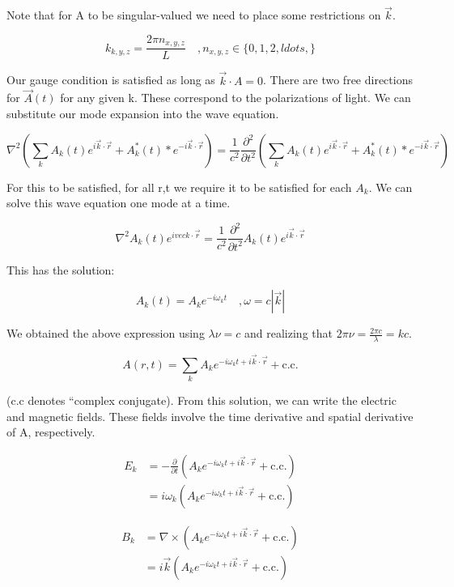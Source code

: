 \documentclass{article}
\begin{document}
Note that for A to be singular-valued we need to place some restrictions on
$\vec{k}$.

\[ 
    k_{k,y,z} = \frac{2\pi n_{x,y,z}}{L} \quad,n_{x,y,z} \in \{0,1,2,ldots,\}
\]

Our gauge condition is satisfied as long as $\vec{k} \cdot A = 0$. There are two
free directions for $\vec{A}(t)$ for any given k. These correspond to the
polarizations of light. We can substitute our mode expansion into the wave
equation.

\[ 
    \nabla^2 \left(\sum_k A_k(t)e^{i \vec{k}\cdot \vec{r}} + A_k^*(t)*e^{-i
    \vec{k} \cdot \vec{r}} \right) 
    = 
    \frac{1}{c^2} \frac{\partial^2}{\partial t^2} \left( \sum_k A_k(t)e^{i
    \vec{k}\cdot \vec{r}} + A_k^*(t)*e^{-i \vec{k} \cdot \vec{r}} \right) 
\]

For this to be satisfied, for all r,t we require it to be satisfied for each
$A_k$. We can solve this wave equation one mode at a time.

\[ 
    \nabla^2 A_k(t) e^{ i vec{k} \cdot \vec{r} } = \frac{1}{c^2}
    \frac{\partial^2}{\partial t^2} A_k(t) e^{ i \vec{k}\cdot \vec{r} } 
\]

This has the solution:

\[ 
    A_k(t) = A_k e^{-i \omega_k t} \quad, \omega = c |\vec{k}|
\]

We obtained the above expression using $\lambda \nu = c$ and realizing that
$2\pi\nu = \frac{2\pi c}{\lambda} = kc$. 

\[
    A(r,t) = \sum_k A_k e^{ -i \omega_k t + i \vec{k} \cdot \vec{r} } +
    \text{c.c.}
\]

(c.c denotes ``complex conjugate). From this solution, we can write the electric
and magnetic fields. These fields involve the time derivative and spatial derivative
of A, respectively.

\begin{align*}
    E_k &= -\frac{\partial }{\partial t} \left( A_k e^{-i \omega_k t + i
    \vec{k}
\cdot \vec{r}} + \text{c.c.} \right) \\
    &= i \omega_k \left( A_k e^{-i \omega_k t + i \vec{k}
    \cdot \vec{r}} + \text{c.c.} \right)
\end{align*}

\begin{align*} 
    B_k &= \nabla \times \left( A_k e^{-i \omega_k t + i \vec{k}
\cdot \vec{r}} + \text{c.c.} \right)  \\
&=  i \vec{k} \left( A_k e^{-i \omega_k t + i \vec{k} \cdot \vec{r}} +
    \text{c.c.} \right)
\end{align*}
\end{document}
